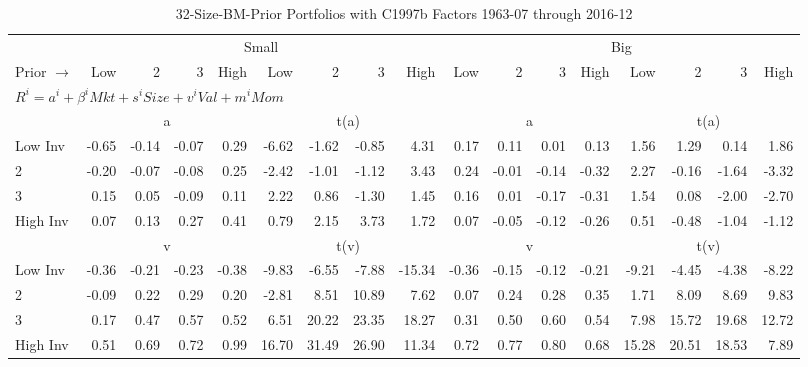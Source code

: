 
\begin{table}[!ht]
\footnotesize
\centering
\caption{32-Size-BM-Prior Portfolios with C1997b Factors 1963-07 through 2016-12}
\begin{tabular}{lrrrrrrrrrrrrrrrr}
  \toprule
    & \multicolumn{8}{c}{Small} & \multicolumn{8}{c}{Big} \\
      \cmidrule(r){2-9} \cmidrule(r){10-17}
    Prior $\rightarrow$ & Low & 2 & 3 & High & Low & 2 & 3 & High & Low & 2 & 3 & High & Low & 2 & 3 & High \\ 
  \midrule
  \multicolumn{17}{l}{$R^i=a^i+\beta^iMkt+s^iSize+v^iVal+m^iMom$} \\

  
    
      & \multicolumn{4}{c}{a} & \multicolumn{4}{c}{t(a)}
    
      & \multicolumn{4}{c}{a} & \multicolumn{4}{c}{t(a)}
    
    \\
      \cmidrule(r){2-5} \cmidrule(r){6-9} \cmidrule(r){10-13} \cmidrule(r){14-17}

    Low Inv   & -0.65  & -0.14  & -0.07  & 0.29  & -6.62  & -1.62  & -0.85  & 4.31  & 0.17  & 0.11  & 0.01  & 0.13  & 1.56  & 1.29  & 0.14  & 1.86  \\
           2  & -0.20  & -0.07  & -0.08  & 0.25  & -2.42  & -1.01  & -1.12  & 3.43  & 0.24  & -0.01  & -0.14  & -0.32  & 2.27  & -0.16  & -1.64  & -3.32  \\
           3  & 0.15  & 0.05  & -0.09  & 0.11  & 2.22  & 0.86  & -1.30  & 1.45  & 0.16  & 0.01  & -0.17  & -0.31  & 1.54  & 0.08  & -2.00  & -2.70  \\
    High Inv  & 0.07  & 0.13  & 0.27  & 0.41  & 0.79  & 2.15  & 3.73  & 1.72  & 0.07  & -0.05  & -0.12  & -0.26  & 0.51  & -0.48  & -1.04  & -1.12  \\

  
    
      & \multicolumn{4}{c}{v} & \multicolumn{4}{c}{t(v)}
    
      & \multicolumn{4}{c}{v} & \multicolumn{4}{c}{t(v)}
    
    \\
      \cmidrule(r){2-5} \cmidrule(r){6-9} \cmidrule(r){10-13} \cmidrule(r){14-17}

    Low Inv   & -0.36  & -0.21  & -0.23  & -0.38  & -9.83  & -6.55  & -7.88  & -15.34  & -0.36  & -0.15  & -0.12  & -0.21  & -9.21  & -4.45  & -4.38  & -8.22  \\
           2  & -0.09  & 0.22  & 0.29  & 0.20  & -2.81  & 8.51  & 10.89  & 7.62  & 0.07  & 0.24  & 0.28  & 0.35  & 1.71  & 8.09  & 8.69  & 9.83  \\
           3  & 0.17  & 0.47  & 0.57  & 0.52  & 6.51  & 20.22  & 23.35  & 18.27  & 0.31  & 0.50  & 0.60  & 0.54  & 7.98  & 15.72  & 19.68  & 12.72  \\
    High Inv  & 0.51  & 0.69  & 0.72  & 0.99  & 16.70  & 31.49  & 26.90  & 11.34  & 0.72  & 0.77  & 0.80  & 0.68  & 15.28  & 20.51  & 18.53  & 7.89  \\


\end{tabular}
\end{table}
